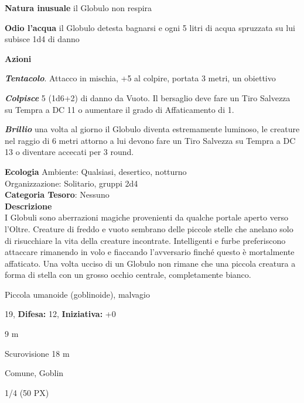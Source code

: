 \begin{multicols}{2}
{\textbf{Natura inusuale} il Globulo non respira

\textbf{Odio l'acqua} il Globulo detesta bagnarsi e ogni 5 litri di acqua spruzzata su lui subisce 1d4 di danno

\textbf{Azioni}

\emph{\textbf{Tentacolo}}. Attacco in mischia, +5 al colpire, portata 3 metri, un obiettivo

\emph{\textbf{Colpisce}} 5 (1d6+2) di danno da Vuoto. Il bersaglio deve fare un Tiro Salvezza su Tempra a DC 11 o aumentare il grado di Affaticamento di 1.

\textbf{\emph{Brillio}} una volta al giorno il Globulo diventa estremamente luminoso, le creature nel raggio di 6 metri attorno a lui devono fare un Tiro Salvezza su Tempra a DC 13 o diventare accecati per 3 round.

\textbf{Ecologia}
Ambiente: Qualsiasi, desertico, notturno\\
Organizzazione: Solitario, gruppi 2d4\\
\textbf{Categoria Tesoro}: Nessuno\\
\textbf{Descrizione}\\
I Globuli sono aberrazioni magiche provenienti da qualche portale aperto verso l'Oltre. Creature di freddo e vuoto sembrano delle piccole stelle che anelano solo di risucchiare la vita della creature incontrate.
Intelligenti e furbe preferiscono attaccare rimanendo in volo e fiaccando l'avversario finché questo è mortalmente affaticato. Una volta ucciso di un Globulo non rimane che una piccola creatura a forma di stella con un grosso occhio centrale, completamente bianco.

\noindent
\begin{description}[noitemsep, topsep=0pt, parsep=0pt, partopsep=0pt, leftmargin=0cm, labelwidth=2.2cm]
	\item[\textbf{Taglia/Tipo:}] Piccola umanoide (goblinoide), malvagio
	\item[\textbf{Caratt.:}] 
	\item[\textbf{Punti Ferita:}] 19,  \textbf{Difesa:} 12,  \textbf{Iniziativa:} +0
	\item[\textbf{Movimento:}] 9 m
	\item[\textbf{Tiri Salvez.:}] 
	\item[\textbf{Sensi:}] Scurovisione 18 m
	\item[\textbf{Linguaggi:}] Comune, Goblin
	\item[\textbf{Sfida:}] 1/4 (50 PX)\smallskip
\end{description}

}
\end{multicols}
